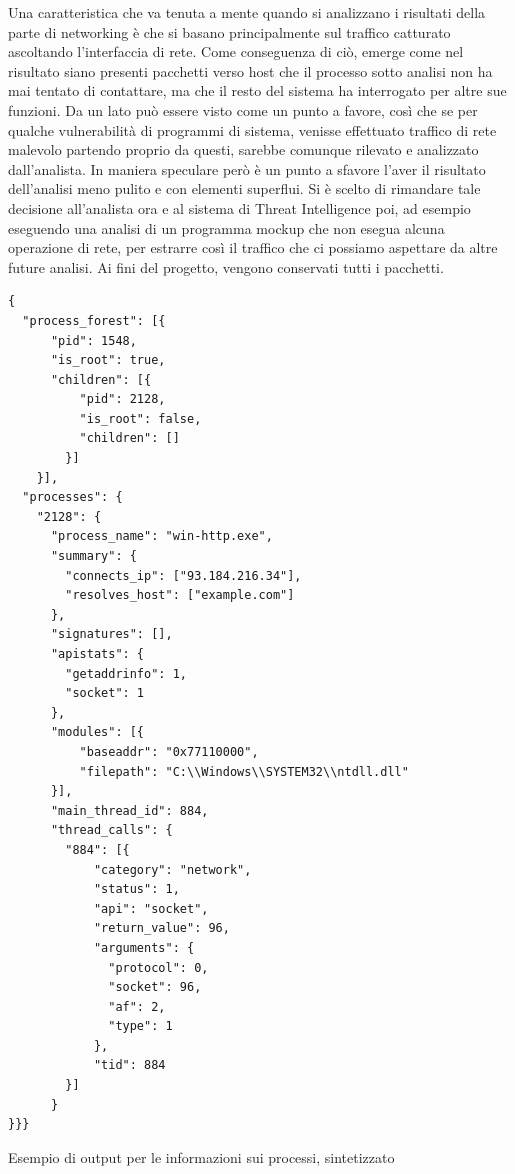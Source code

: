 Una caratteristica che va tenuta a mente quando si analizzano i risultati della parte di networking è che si basano principalmente sul traffico catturato ascoltando l'interfaccia di rete. Come conseguenza di ciò, emerge come nel risultato siano presenti pacchetti verso host che il processo sotto analisi non ha mai tentato di contattare, ma che il resto del sistema ha interrogato per altre sue funzioni.
Da un lato può essere visto come un punto a favore, così che se per qualche vulnerabilità di programmi di sistema, venisse effettuato traffico di rete malevolo partendo proprio da questi, sarebbe comunque rilevato e analizzato dall'analista. In maniera speculare però è un punto a sfavore l'aver il risultato dell'analisi meno pulito e con elementi superflui.
Si è scelto di rimandare tale decisione all'analista ora e al sistema di Threat Intelligence poi, ad esempio eseguendo una analisi di un programma mockup che non esegua alcuna operazione di rete, per estrarre così il traffico che ci possiamo aspettare da altre future analisi. Ai fini del progetto, vengono conservati tutti i pacchetti.

\newpage
\begin{code}
\begin{verbatim}
{
  "process_forest": [{
      "pid": 1548,
      "is_root": true,
      "children": [{
          "pid": 2128,
          "is_root": false,
          "children": []
        }]
    }],
  "processes": {
    "2128": {
      "process_name": "win-http.exe",
      "summary": {
        "connects_ip": ["93.184.216.34"],
        "resolves_host": ["example.com"]
      },
      "signatures": [],
      "apistats": {
        "getaddrinfo": 1,
        "socket": 1
      },
      "modules": [{
          "baseaddr": "0x77110000",
          "filepath": "C:\\Windows\\SYSTEM32\\ntdll.dll"
      }],
      "main_thread_id": 884,
      "thread_calls": {
        "884": [{
            "category": "network",
            "status": 1,
            "api": "socket",
            "return_value": 96,
            "arguments": {
              "protocol": 0,
              "socket": 96,
              "af": 2,
              "type": 1
            },
            "tid": 884
        }]
      }
}}}
\end{verbatim}
\caption{Esempio di output per le informazioni sui processi, sintetizzato}
\end{code}

